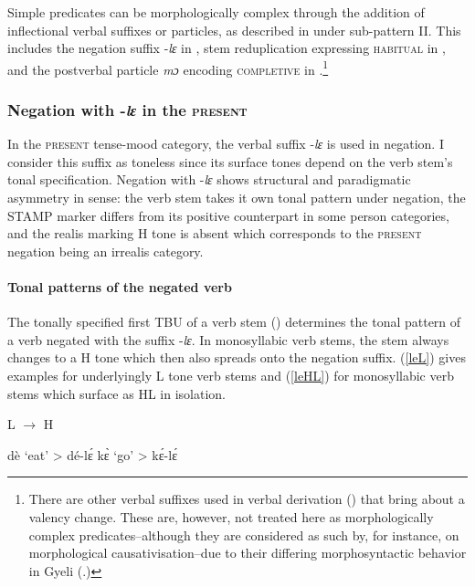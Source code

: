 Simple predicates can be morphologically complex through the addition of inflectional verbal suffixes or particles, as described in  under sub-pattern II. This includes the negation suffix -{\itshape lɛ} in , stem reduplication expressing \textsc{habitual} in , and the postverbal particle {\itshape mɔ} encoding \textsc{completive} in .\footnote{There are other verbal suffixes used in verbal derivation () that bring about a  valency change. These are, however, not treated here as morphologically complex predicates--although they are considered as such by, for instance, \citet[51]{butt2010} on morphological causativisation--due to their differing morphosyntactic behavior in Gyeli (.)}









\subsubsection{Negation with -{\itshape lɛ} in the \textsc{present}}
\label{sec:NEGPRES}

In the \textsc{present} tense-mood category, the verbal suffix -{\itshape lɛ} is used in negation. I consider this suffix as toneless since its surface tones depend on the verb stem's tonal specification. Negation with -{\itshape lɛ} shows structural and paradigmatic asymmetry in  sense: the verb stem takes it own tonal pattern under negation, the STAMP marker differs from its positive counterpart in some person categories, and the realis marking H tone is absent which corresponds to the \textsc{present} negation being an irrealis category.

\paragraph{Tonal patterns of the negated verb}
The tonally specified first TBU of a verb stem () determines the tonal pattern of a verb negated with the suffix -{\itshape lɛ}. In monosyllabic verb stems, the stem always changes to a H tone which then also spreads onto the negation suffix. (\ref{leL}) gives examples for underlyingly L tone verb stems and (\ref{leHL}) for monosyllabic verb stems which surface as HL in isolation.


\begin{exe}
\ex\label{leL} L $\rightarrow$ H
\begin{xlist}
\ex dè `eat' > dé-lɛ́ 
\ex  kɛ̀ `go' > kɛ́-lɛ́ 
\end{xlist}
\end{exe}


